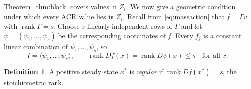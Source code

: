 \documentclass[11pt,a4paper]{article}
\theoremstyle{plain}
\theoremstyle{definition}
\newtheorem{definition}[theorem]{Definition}
\theoremstyle{remark}
\newcommand{\rank}{\operatorname{rank}}
\begin{document}
Theorem~\ref{thm:block} covers values in $Z_i$. We now give a geometric condition under which every ACR value lies in $Z_i$. Recall from \eqref{eq:massaction} that $f=\Gamma v$ with $\rank\Gamma=s$. Choose $s$ linearly independent rows of $\Gamma$ and let $\psi=(\psi_1,\dots,\psi_s)$ be the corresponding coordinates of $f$. Every $f_j$ is a constant linear combination of $\psi_1,\dots,\psi_s$, so
\begin{equation}\label{eq:psi}
  I=\langle\psi_1,\dots,\psi_s\rangle,\qquad \rank Df(x)=\rank D\psi(x)\le s\quad\text{for all }x .
\end{equation}

\begin{definition}\label{def:regular}
A positive steady state $x^*$ is \emph{regular} if $\rank Df(x^*)=s$, the stoichiometric rank.
\end{definition}
\end{document}
